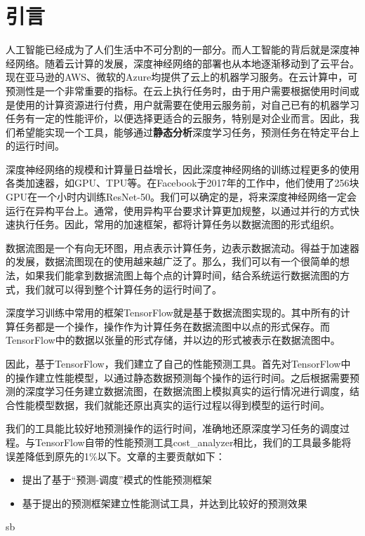 \chapter{引言}
\label{cha:intro}

    人工智能已经成为了人们生活中不可分割的一部分。而人工智能的背后就是深度神经网络。随着云计算的发展，深度神经网络的部署也从本地逐渐移动到了云平台。现在亚马逊的AWS、微软的Azure均提供了云上的机器学习服务。在云计算中，可预测性是一个非常重要的指标。\cite{cloud, serverless}在云上执行任务时，由于用户需要根据使用时间或是使用的计算资源进行付费，用户就需要在使用云服务前，对自己已有的机器学习任务有一定的性能评价，以便选择更适合的云服务，特别是对企业而言。因此，我们希望能实现一个工具，能够通过{\bfseries 静态分析}深度学习任务，预测任务在特定平台上的运行时间。

    深度神经网络的规模和计算量日益增长，因此深度神经网络的训练过程更多的使用各类加速器，如GPU、TPU等。在Facebook于2017年的工作中，他们使用了256块GPU在一个小时内训练ResNet-50。\cite{fb_imagenet}我们可以确定的是，将来深度神经网络一定会运行在异构平台上。通常，使用异构平台要求计算更加规整，以通过并行的方式快速执行任务。因此，常用的加速框架，都将计算任务以数据流图的形式组织。
    
    数据流图是一个有向无环图，用点表示计算任务，边表示数据流动。\cite{dataflow}得益于加速器的发展，数据流图现在的使用越来越广泛了。那么，我们可以有一个很简单的想法，如果我们能拿到数据流图上每个点的计算时间，结合系统运行数据流图的方式，我们就可以得到整个计算任务的运行时间了。
    
    深度学习训练中常用的框架TensorFlow\cite{tensorflow}就是基于数据流图实现的。其中所有的计算任务都是一个操作，操作作为计算任务在数据流图中以点的形式保存。而TensorFlow中的数据以张量的形式存储，并以边的形式被表示在数据流图中。
    
    因此，基于TensorFlow，我们建立了自己的性能预测工具。首先对TensorFlow中的操作建立性能模型，以通过静态数据预测每个操作的运行时间。之后根据需要预测的深度学习任务建立数据流图，在数据流图上模拟真实的运行情况进行调度，结合性能模型数据，我们就能还原出真实的运行过程以得到模型的运行时间。
    
    我们的工具能比较好地预测操作的运行时间，准确地还原深度学习任务的调度过程。与TensorFlow自带的性能预测工具cost\_analyzer相比，我们的工具最多能将误差降低到原先的1\%以下。文章的主要贡献如下：
    
    \begin{itemize}
        \setlength{\itemindent}{1em}
        \item 提出了基于“预测-调度”模式的性能预测框架
        \item 基于提出的预测框架建立性能测试工具，并达到比较好的预测效果
    \end{itemize}
    
    \begin{translationbib}
        \item sb
    \end{translationbib}